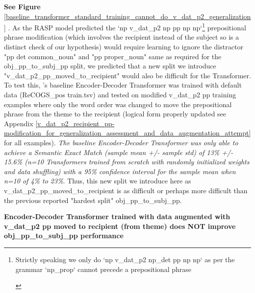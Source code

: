 \documentclass[11pt]{article}
\begin{document}
\textbf{See Figure} \ref{baseline_transformer_standard_training_cannot_do_v_dat_p2_generalization} . As the RASP model predicted the `np v\_dat\_p2 np pp np np`\footnote{\begin{footnotesize}Strictly speaking we only do `np v\_dat\_p2 np\_det pp np np` as per the grammar `np\_prop` cannot precede a prepositional phrase
\end{footnotesize}
} prepositional phrase modification (which involves the recipient instead of the subject so is a distinct check of our hypothesis) would require learning to ignore the distractor "pp det common\_noun" and "pp proper\_noun" same as required for the obj\_pp\_to\_subj\_pp split, we predicted that a new split we introduce "v\_dat\_p2\_pp\_moved\_to\_recipient" would also be difficult for the Transformer. To test this, \cite{Wu2023}'s baseline Encoder-Decoder Transformer was trained with default data (ReCOGS\_pos train.tsv) and tested on modified v\_dat\_p2 pp training examples where only the word order was changed to move the prepositional phrase from the theme to the recipient (logical form properly updated see Appendix \ref{v_dat_p2_recipient_pp-modification_for_generalization_assessment_and_data_augmentation_attempt} for all examples). \textit{The baseline \cite{Wu2023} Encoder-Decoder Transformer was only able to achieve a Semantic Exact Match (sample mean +/- sample std) of 13\% +/- 15.6\% (n=10 Transformers trained from scratch with randomly initialized weights and data shuffling) with a 95\% confidence interval for the sample mean when n=10 of 4\% to 23\%}. Thus, this new split we introduce here as v\_dat\_p2\_pp\_moved\_to\_recipient is as difficult or perhaps more difficult than the previous reported "hardest split" obj\_pp\_to\_subj\_pp.


\textbf{\cite{Wu2023} Encoder-Decoder Transformer trained with data augmented with v\_dat\_p2 pp moved to recipient (from theme) does NOT improve obj\_pp\_to\_subj\_pp performance}
\end{document}
